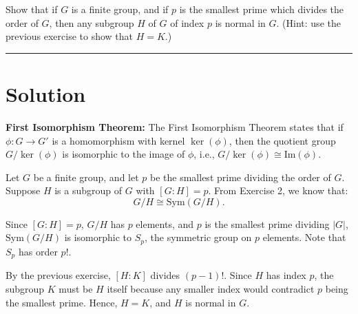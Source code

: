 \documentclass[12pt]{amsart}
\theoremstyle{definition}
\numberwithin{equation}{section}
\begin{document}
\begin{exercise}{3} Show that if \(G\) is a finite group, and if \(p\) is the smallest prime which divides the order of \(G\), then any subgroup \(H\) of \(G\) of index \(p\) is normal in \(G\). (Hint: use the previous exercise to show that \(H=K\).)

    \noindent\rule{\linewidth}{1pt}

    \section*{Solution}
    
    \noindent \textbf{First Isomorphism Theorem:} The First Isomorphism Theorem states that if \( \phi: G \to G' \) is a homomorphism with kernel \( \ker(\phi) \), then the quotient group \( G / \ker(\phi) \) is isomorphic to the image of \( \phi \), i.e., \( G / \ker(\phi) \cong \text{Im}(\phi) \).
    
    Let \(G\) be a finite group, and let \(p\) be the smallest prime dividing the order of \(G\). Suppose \(H\) is a subgroup of \(G\) with \([G : H] = p\). From Exercise 2, we know that:
    \[
    G/H \cong \text{Sym}(G/H).
    \]
    
    Since \([G : H] = p\), \(G/H\) has \(p\) elements, and \(p\) is the smallest prime dividing \(|G|\), \(\text{Sym}(G/H)\) is isomorphic to \(S_p\), the symmetric group on \(p\) elements. Note that \(S_p\) has order \(p!\).

    By the previous exercise, \([H : K]\) divides \((p-1)!\). Since \(H\) has index \(p\), the subgroup \(K\) must be \(H\) itself because any smaller index would contradict \(p\) being the smallest prime. Hence, \(H = K\), and \(H\) is normal in \(G\).

\end{exercise}
\newpage
\end{document}
